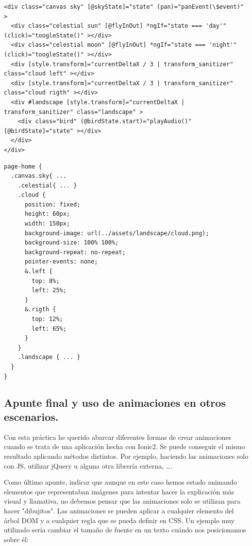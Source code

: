 \noindent
\begin{minipage}[t]{.48\textwidth}
{\begin{lstlisting}[style=htmlcssjs,frame=tlrb, xleftmargin={0.2cm}]
<div class="canvas sky" [@skyState]="state" (pan)="panEvent(\$event)" >
  <div class="celestial sun" [@flyInOut] *ngIf="state === 'day'" (click)="toogleState()" ></div>
  <div class="celestial moon" [@flyInOut] *ngIf="state === 'night'" (click)="toogleState()" ></div>
  <div [style.transform]="currentDeltaX / 3 | transform_sanitizer" class="cloud left" ></div>
  <div [style.transform]="currentDeltaX / 3 | transform_sanitizer" class="cloud rigth" ></div>
  <div #landscape [style.transform]="currentDeltaX | transform_sanitizer" class="landscape" >
    <div class="bird" (@birdState.start)="playAudio()" [@birdState]="state" ></div>
  </div>
</div>

\end{lstlisting}}
\end{minipage}\hfill
\noindent
\begin{minipage}[t]{.48\textwidth}
{\begin{lstlisting}[style=htmlcssjs,frame=tlrb, xleftmargin={0.2cm}]
page-home {
  .canvas.sky{ ...
    .celestial{ ... }
    .cloud {
      position: fixed;
      height: 60px;
      width: 150px;
      background-image: url(../assets/landscape/cloud.png);
      background-size: 100% 100%;
      background-repeat: no-repeat;
      pointer-events: none;
      &.left {
        top: 8%;
        left: 25%;
      }
      &.rigth {
        top: 12%;
        left: 65%;
      }
    }
    .landscape { ... }
  }
}
\end{lstlisting}}
\end{minipage}

\subsection{Apunte final y uso de animaciones en otros escenarios.}

Con esta práctica he querido abarcar diferentes formas de crear animaciones cuando se trata de una aplicación hecha con Ionic2. Se puede conseguir el mismo resultado aplicando métodos distintos. Por ejemplo, haciendo las animaciones solo con JS, utilizar jQuery u alguna otra librería externa, \ldots.

Como último apunte, indicar que aunque en este caso hemos estado animando elementos que representaban imágenes para intentar hacer la explicación más visual y llamativa, no debemos pensar que las animaciones solo se utilizan para hacer "dibujitos". Las animaciones se pueden aplicar a cualquier elemento del árbol \gls{DOM} y a cualquier regla que se pueda definir en \gls{CSS}. Un ejemplo muy utilizado sería cambiar el tamaño de fuente en un texto cuándo nos posicionamos sobre él:

